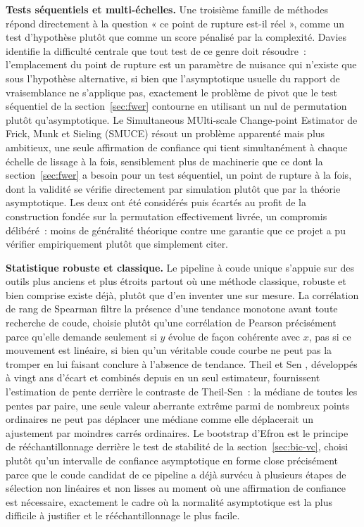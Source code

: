 \documentclass[11pt]{article}
\begin{document}
\textbf{Tests séquentiels et multi-échelles.} Une troisième famille de
méthodes répond directement à la question « ce point de rupture est-il
réel », comme un test d'hypothèse plutôt que comme un score pénalisé par
la complexité. Davies \citep{davies1977} identifie la difficulté centrale
que tout test de ce genre doit résoudre~: l'emplacement du point de
rupture est un paramètre de nuisance qui n'existe que sous l'hypothèse
alternative, si bien que l'asymptotique usuelle du rapport de
vraisemblance ne s'applique pas, exactement le problème de pivot que le
test séquentiel de la section~\ref{sec:fwer} contourne en utilisant un
nul de permutation plutôt qu'asymptotique. Le Simultaneous MUlti-scale
Change-point Estimator de Frick, Munk et Sieling (SMUCE)
\citep{frick2014} résout un problème apparenté mais plus ambitieux, une
seule affirmation de confiance qui tient simultanément à chaque échelle
de lissage à la fois, sensiblement plus de machinerie que ce dont la
section~\ref{sec:fwer} a besoin pour un test séquentiel, un point de
rupture à la fois, dont la validité se vérifie directement par simulation
plutôt que par la théorie asymptotique. Les deux ont été considérés puis
écartés au profit de la construction fondée sur la permutation
effectivement livrée, un compromis délibéré~: moins de généralité
théorique contre une garantie que ce projet a pu vérifier
empiriquement plutôt que simplement citer.

\textbf{Statistique robuste et classique.} Le pipeline à coude unique
s'appuie sur des outils plus anciens et plus étroits partout où une
méthode classique, robuste et bien comprise existe déjà, plutôt que d'en
inventer une sur mesure. La corrélation de rang de Spearman
\citep{spearman1904} filtre la présence d'une tendance monotone avant
toute recherche de coude, choisie plutôt qu'une corrélation de Pearson
précisément parce qu'elle demande seulement si $y$ évolue de façon
cohérente avec $x$, pas si ce mouvement est linéaire, si bien qu'un
véritable coude courbe ne peut pas la tromper en lui faisant conclure à
l'absence de tendance. Theil \citep{theil1950} et Sen \citep{sen1968},
développés à vingt ans d'écart et combinés depuis en un seul estimateur,
fournissent l'estimation de pente derrière le contraste de Theil-Sen~: la
médiane de toutes les pentes par paire, une seule valeur aberrante
extrême parmi de nombreux points ordinaires ne peut pas déplacer une
médiane comme elle déplacerait un ajustement par moindres carrés
ordinaires. Le bootstrap d'Efron \citep{efron1979} est le principe de
rééchantillonnage derrière le test de stabilité de la
section~\ref{sec:bic-vc}, choisi plutôt qu'un intervalle de confiance
asymptotique en forme close précisément parce que le coude candidat de ce
pipeline a déjà survécu à plusieurs étapes de sélection non linéaires et
non lisses au moment où une affirmation de confiance est nécessaire,
exactement le cadre où la normalité asymptotique est la plus difficile à
justifier et le rééchantillonnage le plus facile.
\end{document}
